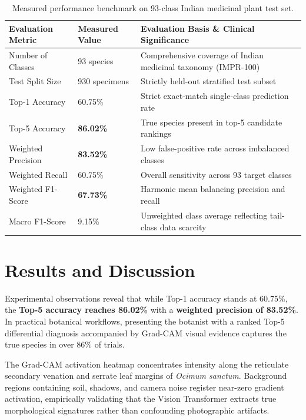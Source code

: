 \documentclass[sn-mathphys,Numbered]{sn-jnl}%
\begin{document}
\begin{table}[h]
\caption{Measured performance benchmark on 93-class Indian medicinal plant test set.}\label{tab:metrics}
\begin{tabular*}{\textwidth}{@{\extracolsep\fill}lll@{\extracolsep\fill}}
\toprule
Evaluation Metric & Measured Value & Evaluation Basis \& Clinical Significance \\
\midrule
Number of Classes & 93 species & Comprehensive coverage of Indian medicinal taxonomy (IMPR-100) \\
Test Split Size & 930 specimens & Strictly held-out stratified test subset \\
Top-1 Accuracy & 60.75\% & Strict exact-match single-class prediction rate \\
Top-5 Accuracy & \textbf{86.02\%} & True species present in top-5 candidate rankings \\
Weighted Precision & \textbf{83.52\%} & Low false-positive rate across imbalanced classes \\
Weighted Recall & 60.75\% & Overall sensitivity across 93 target classes \\
Weighted F1-Score & \textbf{67.73\%} & Harmonic mean balancing precision and recall \\
Macro F1-Score & 9.15\% & Unweighted class average reflecting tail-class data scarcity \\
\bottomrule
\end{tabular*}
\end{table}

\section{Results and Discussion}\label{sec8}
Experimental observations reveal that while Top-1 accuracy stands at 60.75\%, the \textbf{Top-5 accuracy reaches 86.02\%} with a \textbf{weighted precision of 83.52\%}. In practical botanical workflows, presenting the botanist with a ranked Top-5 differential diagnosis accompanied by Grad-CAM visual evidence captures the true species in over 86\% of trials.

The Grad-CAM activation heatmap concentrates intensity along the reticulate secondary venation and serrate leaf margins of \textit{Ocimum sanctum}. Background regions containing soil, shadows, and camera noise register near-zero gradient activation, empirically validating that the Vision Transformer extracts true morphological signatures rather than confounding photographic artifacts.
\end{document}
